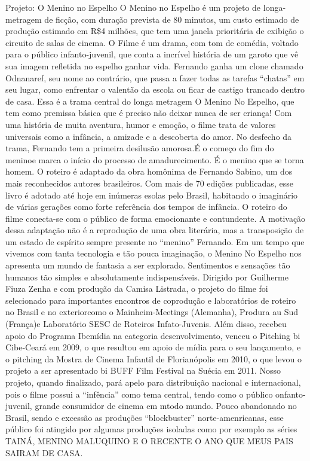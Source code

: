 Projeto: O Menino no Espelho
O Menino no Espelho é um projeto de longa-metragem de ficção, com duração prevista de 80 minutos, um custo estimado de produção estimado em R\$4 milhões, que tem uma janela prioritária de exibição o circuito de salas de cinema.
O Filme é um drama, com tom de comédia, voltado para o público infanto-juvenil, que conta a incrível história de um garoto que vê sua imagem refletida no espelho ganhar vida. Fernando ganha um clone chamado Odnanaref, seu nome ao contrário, que passa a fazer todas as tarefas “chatas” em seu lugar, como enfrentar o valentão da escola ou ficar de castigo trancado dentro de casa.
Essa é a trama central do longa metragem O Menino No Espelho, que tem como premissa básica que é preciso não deixar nunca de ser criança! Com uma história de muita aventura, humor e emoção, o filme trata de valores universais como a infância, a amizade e a descoberta do amor.
No desfecho da trama, Fernando tem a primeira desilusão amorosa.É o começo do fim do meninoe marca o início do processo de amadurecimento. É o menino que se torna homem.
O roteiro é adaptado da obra homônima de Fernando Sabino, um dos mais reconhecidos autores brasileiros. Com mais de 70 edições publicadas, esse livro é adotado até hoje em inúmeras esolas pelo Brasil, habitando o imaginário de várias gerações como forte referência dos tempos de infância.
O roteiro do filme conecta-se com o público de forma emocionante e contundente. A motivação dessa adaptação não é a reprodução de uma obra literária, mas a transposição de um estado de espírito sempre presente no “menino” Fernando. Em um tempo que vivemos com tanta tecnologia e tão pouca imaginação, o Menino No Espelho nos apresenta um mundo de fantasia a ser explorado. Sentimentos e sensações tão humanos tão simples e absolutamente indispensáveis.
Dirigido por Guilherme Fiuza Zenha e com produção da Camisa Listrada, o projeto do filme foi selecionado para importantes encontros de coprodução e laboratórios de roteiro no Brasil e no exteriorcomo o Mainheim-Meetings (Alemanha), Produra au Sud (França)e Laboratório SESC de Roteiros Infato-Juvenis. Além disso, recebeu apoio do Programa Ibemídia na categoria desenvolvimento, venceu o Pitching bi Cibe-Ceará em 2009, o que resultou em apoio de mídia para o seu lançamento, e o pitching da Mostra de Cinema Infantil de Florianópolis em 2010, o que levou o projeto a ser apresentado bi BUFF Film Festival na Suécia em 2011.
Nosso projeto, quando finalizado, pará apelo para distribuição nacional e internacional, pois o filme possui a “infência” como tema central, tendo como o público onfanto-juvenil, grande consumidor de cinema em mtodo mundo. Pouco abandonado no Brasil, sendo e excessão as produções “blockbuster” norte-amenricanas, esse público foi atingido por algumas produções isoladas como por exemplo as séries TAINÁ, MENINO MALUQUINO E O RECENTE O ANO QUE MEUS PAIS SAIRAM DE CASA.

